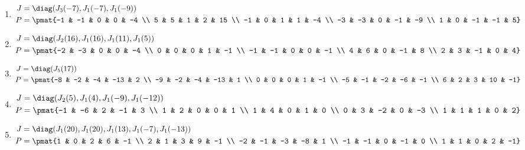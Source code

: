 \begin{enumerate}
\item

\begin{align*}
J &= \diag(J_{3}(-7), J_{1}(-7), J_{1}(-9))\\
P &= \pmat{-1 & -1 & 0 & 0 & -4 \\ 5 & 5 & 1 & 2 & 15 \\ -1 & 0 & 1 & 1 & -4 \\ -3 & -3 & 0 & -1 & -9 \\ 1 & 0 & -1 & -1 & 5}
\end{align*}

\item

\begin{align*}
J &= \diag(J_{2}(16), J_{1}(16), J_{1}(11), J_{1}(5))\\
P &= \pmat{-2 & -3 & 0 & 0 & -4 \\ 0 & 0 & 0 & 1 & -1 \\ -1 & -1 & 0 & 0 & -1 \\ 4 & 6 & 0 & -1 & 8 \\ 2 & 3 & -1 & 0 & 4}
\end{align*}

\item

\begin{align*}
J &= \diag(J_{5}(17))\\
P &= \pmat{-8 & -2 & -4 & -13 & 2 \\ -9 & -2 & -4 & -13 & 1 \\ 0 & 0 & 0 & 1 & -1 \\ -5 & -1 & -2 & -6 & -1 \\ 6 & 2 & 3 & 10 & -1}
\end{align*}

\item

\begin{align*}
J &= \diag(J_{2}(5), J_{1}(4), J_{1}(-9), J_{1}(-12))\\
P &= \pmat{-1 & -6 & 2 & -1 & 3 \\ 1 & 2 & 0 & 0 & 1 \\ 1 & 4 & 0 & 1 & 0 \\ 0 & 3 & -2 & 0 & -3 \\ 1 & 1 & 1 & 0 & 2}
\end{align*}

\item

\begin{align*}
J &= \diag(J_{1}(20), J_{1}(20), J_{1}(13), J_{1}(-7), J_{1}(-13))\\
P &= \pmat{1 & 0 & 2 & 6 & -1 \\ 2 & 1 & 3 & 9 & -1 \\ -2 & -1 & -3 & -8 & 1 \\ -1 & -1 & 0 & -1 & 0 \\ 1 & 1 & 0 & 2 & -1}
\end{align*}


\end{enumerate}
